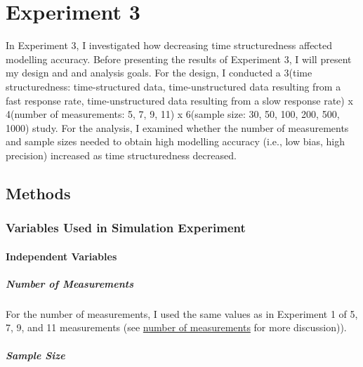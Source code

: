 \documentclass[
12pt, %
twoside,
english]{guelphthesis}
\begin{document}
\hypertarget{experiment-3}{%
\chapter{Experiment 3}\label{experiment-3}}

In Experiment 3, I investigated how decreasing time structuredness affected modelling accuracy. Before presenting the results of Experiment 3, I will present my design and and analysis goals. For the design, I conducted a 3(time structuredness: time-structured data, time-unstructured data resulting from a fast response rate, time-unstructured data resulting from a slow response rate) x 4(number of measurements: 5, 7, 9, 11) x 6(sample size: 30, 50, 100, 200, 500, 1000) study. For the analysis, I examined whether the number of measurements and sample sizes needed to obtain high modelling accuracy (i.e., low bias, high precision) increased as time structuredness decreased.

\hypertarget{methods-2}{%
\section{Methods}\label{methods-2}}

\hypertarget{variables-used-in-simulation-experiment-2}{%
\subsection{Variables Used in Simulation Experiment}\label{variables-used-in-simulation-experiment-2}}

\hypertarget{independent-variables-2}{%
\subsubsection{Independent Variables}\label{independent-variables-2}}

\hypertarget{number-of-measurements-2}{%
\paragraph{Number of Measurements}\label{number-of-measurements-2}}

For the number of measurements, I used the same values as in Experiment 1 of 5, 7, 9, and 11 measurements (see \protect\hyperlink{number-measurements}{number of measurements} for more discussion)).

\hypertarget{sample-size-1}{%
\paragraph{Sample Size}\label{sample-size-1}}
\end{document}

